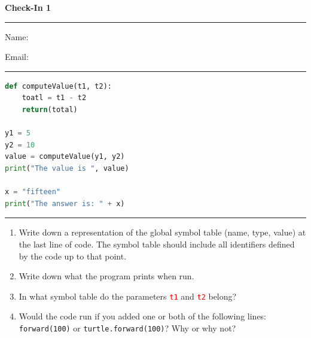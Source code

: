 \documentclass[12pt]{article}
\begin{document}
\begin{center}
  {\Large {\bf Check-In 1}}
  
\end{center}
\vspace{5pt}
\hrule
\vspace{5pt}

Name:

\vspace{5mm}

Email:


\vspace{5pt}
\hrule
\vspace{5pt}

\begin{lstlisting}[language=Python]
def computeValue(t1, t2):
    toatl = t1 - t2
    return(total)

y1 = 5
y2 = 10
value = computeValue(y1, y2)
print("The value is ", value)

x = "fifteen"
print("The answer is: " + x)
\end{lstlisting}


\vspace{5pt}
\hrule
\vspace{5pt}

\begin{enumerate}
\item Write down a representation of the global symbol table (name, type, value) at the last line of code. The symbol table should include all identifiers defined by the code up to that point.

\vspace{45mm}
  
\item Write down what the program prints when run.

  \vspace{15mm}

\item In what symbol table do the parameters \texttt{\textcolor{red}{t1}} and \textcolor{red}{\texttt{t2}} belong?

  \vspace{15mm}

\item Would the code run if you added one or both of the following lines: \texttt{forward(100)} or \texttt{turtle.forward(100)}? Why or why not? 

  \vspace{15mm}
  
\end{enumerate}



\end{document}
